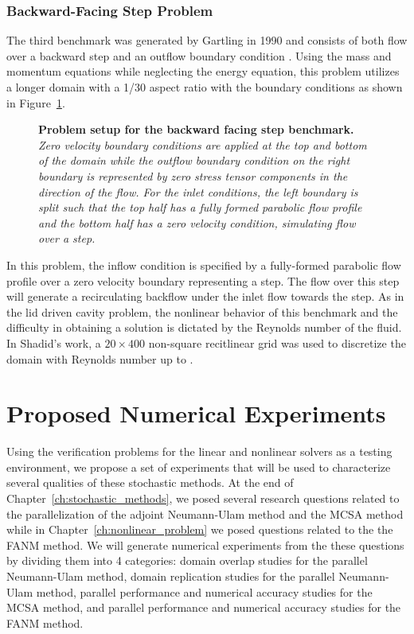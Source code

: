 \subsubsection{Backward-Facing Step Problem}
\label{subsubsec:backward_facing_step}
The third benchmark was generated by Gartling in 1990 and consists of
both flow over a backward step and an outflow boundary condition
\citep{gartling_test_1990}. Using the mass and momentum equations
while neglecting the energy equation, this problem utilizes a longer
domain with a 1/30 aspect ratio with the boundary conditions as shown
in Figure~\ref{fig:backward_facing_step}.
\begin{figure}[htpb!]
  \begin{center}
    \scalebox{1.3}{
       }
  \end{center}
  \caption{\textbf{Problem setup for the backward facing step
      benchmark.} \textit{Zero velocity boundary conditions are
      applied at the top and bottom of the domain while the outflow
      boundary condition on the right boundary is represented by zero
      stress tensor components in the direction of the flow. For the
      inlet conditions, the left boundary is split such that the top
      half has a fully formed parabolic flow profile and the bottom
      half has a zero velocity condition, simulating flow over a
      step.}}
  \label{fig:backward_facing_step}
\end{figure}
In this problem, the inflow condition is specified by a fully-formed
parabolic flow profile over a zero velocity boundary representing a
step. The flow over this step will generate a recirculating backflow
under the inlet flow towards the step. As in the lid driven cavity
problem, the nonlinear behavior of this benchmark and the difficulty
in obtaining a solution is dictated by the Reynolds number of the
fluid. In Shadid's work, a $20 \times 400$ non-square recitlinear grid
was used to discretize the domain with Reynolds number up to
.

\section{Proposed Numerical Experiments}
\label{sec:numerical_experiments}
Using the verification problems for the linear and nonlinear solvers
as a testing environment, we propose a set of experiments that will be
used to characterize several qualities of these stochastic methods. At
the end of Chapter~\ref{ch:stochastic_methods}, we posed several
research questions related to the parallelization of the adjoint
Neumann-Ulam method and the MCSA method while in
Chapter~\ref{ch:nonlinear_problem} we posed questions related to the
the FANM method. We will generate numerical experiments from the these
questions by dividing them into 4 categories: domain overlap studies
for the parallel Neumann-Ulam method, domain replication studies for
the parallel Neumann-Ulam method, parallel performance and numerical
accuracy studies for the MCSA method, and parallel performance and
numerical accuracy studies for the FANM method.

